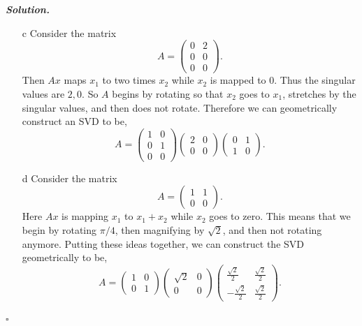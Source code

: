 \documentclass[12pt]{report}
\newenvironment{solution}[1][\it{Solution}]{\textbf{#1. } }{$\square$}
\begin{document}
\begin{solution}
\begin{enumerate}
        \item [c] Consider the matrix $$A = \begin{pmatrix} 0&2\\0&0\\0&0 \end{pmatrix}.$$ Then $Ax$ maps $x_1$ to two times $x_2$ while $x_2$ is mapped to $0$. Thus the singular values are $2,0$. So $A$ begins by rotating so that $x_2$ goes to $x_1$, stretches by the singular values, and then does not rotate. Therefore we can geometrically construct an SVD to be, $$A = \begin{pmatrix} 1&0\\0&1\\0&0\end{pmatrix}\begin{pmatrix} 2&0\\0&0\end{pmatrix}\begin{pmatrix} 0&1\\1&0\end{pmatrix}.$$ 
        
        \item [d] Consider the matrix $$A = \begin{pmatrix} 1&1\\0&0 \end{pmatrix}.$$ Here $Ax$ is mapping $x_1$ to $x_1 + x_2$ while $x_2$ goes to zero. This means that we begin by rotating $\pi/4$, then magnifying by $\sqrt{2}$, and then not rotating anymore. Putting these ideas together, we can construct the SVD geometrically to be,
        $$A = \begin{pmatrix} 1&0\\0&1\end{pmatrix}\begin{pmatrix} \sqrt{2}&0\\0&0\end{pmatrix}\begin{pmatrix} \frac{\sqrt{2}}{2}&\frac{\sqrt{2}}{2}\\-\frac{\sqrt{2}}{2}&\frac{\sqrt{2}}{2}\end{pmatrix}.$$ 
        

\end{enumerate}
\end{solution}
\end{document}
